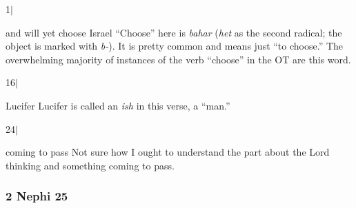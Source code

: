 		\begin{compactdesc}

		\item[1$\vert$]
		\begin{compactdesc}
		\item[and will yet choose Israel] ``Choose'' here is \textit{bahar} (\textit{het} as the second radical; the object is marked with \textit{b-}). It is pretty common and means just ``to choose.'' The overwhelming majority of instances of the verb ``choose'' in the OT are this word.
		\end{compactdesc}

		\item[16$\vert$]
		\begin{compactdesc}
		\item[Lucifer] Lucifer is called an \textit{ish} in this verse, a ``man.''
		\end{compactdesc}

		\item[24$\vert$]
		\begin{compactdesc}
		\item[coming to pass] Not sure how I ought to understand the part about the Lord thinking and something coming to pass.
		\end{compactdesc}

		\end{compactdesc}

	\subsubsection{2 Nephi 25} %

